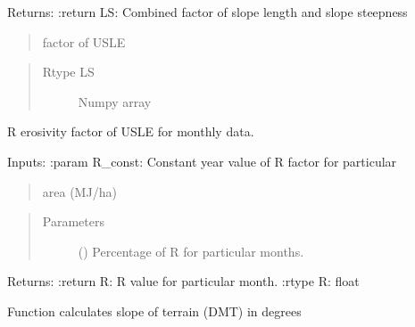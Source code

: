 \documentclass[letterpaper,10pt,english]{sphinxmanual}
\begin{document}
\begin{fulllineitems}
\begin{fulllineitems}
\begin{quote}
\begin{description}
\end{description}\end{quote}

Returns:
:return LS: Combined factor of slope length and slope steepness
\begin{quote}

factor of USLE
\end{quote}
\begin{quote}\begin{description}
\item[{Rtype LS}] \leavevmode
Numpy array

\end{description}\end{quote}

\end{fulllineitems}


\begin{fulllineitems}
\label{\detokenize{libs:usle.RadUSLE.fR}}
R erosivity factor of USLE for monthly data.

Inputs:
:param R\_const: Constant year value of R factor for particular
\begin{quote}

area (MJ/ha)
\end{quote}
\begin{quote}\begin{description}
\item[{Parameters}] \leavevmode
{} () \textendash{} Percentage of R for particular months.

\end{description}\end{quote}

Returns:
:return R: R value for particular month.
:rtype R: float

\end{fulllineitems}


\begin{fulllineitems}
\label{\detokenize{libs:usle.RadUSLE.slope}}
Function calculates slope of terrain (DMT) in degrees


\end{fulllineitems}
\end{fulllineitems}
\end{document}
